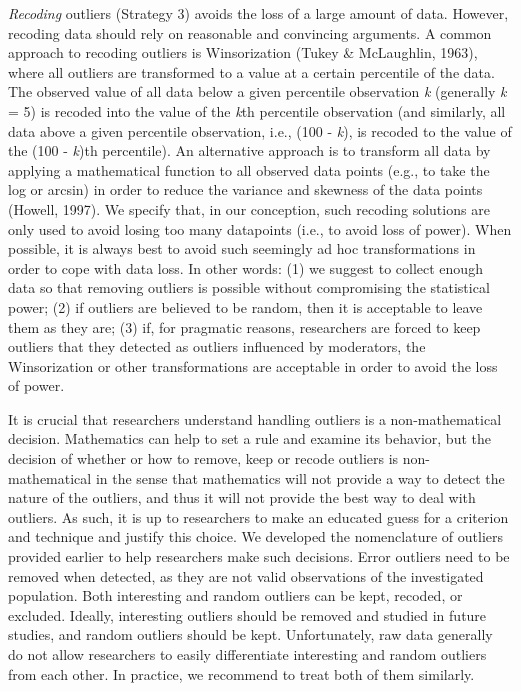 \documentclass[man,floatsintext]{apa6}
\begin{document}
\emph{Recoding} outliers (Strategy 3) avoids the loss of a large amount of data. However, recoding data should rely on reasonable and convincing arguments. A common approach to recoding outliers is Winsorization (Tukey \& McLaughlin, 1963), where all outliers are transformed to a value at a certain percentile of the data. The observed value of all data below a given percentile observation \emph{k} (generally \emph{k} = 5) is recoded into the value of the \emph{k}th percentile observation (and similarly, all data above a given percentile observation, i.e., (100 - \emph{k}), is recoded to the value of the (100 - \emph{k})th percentile). An alternative approach is to transform all data by applying a mathematical function to all observed data points (e.g., to take the log or arcsin) in order to reduce the variance and skewness of the data points (Howell, 1997). We specify that, in our conception, such recoding solutions are only used to avoid losing too many datapoints (i.e., to avoid loss of power). When possible, it is always best to avoid such seemingly ad hoc transformations in order to cope with data loss. In other words: (1) we suggest to collect enough data so that removing outliers is possible without compromising the statistical power; (2) if outliers are believed to be random, then it is acceptable to leave them as they are; (3) if, for pragmatic reasons, researchers are forced to keep outliers that they detected as outliers influenced by moderators, the Winsorization or other transformations are acceptable in order to avoid the loss of power.

It is crucial that researchers understand handling outliers is a non-mathematical decision. Mathematics can help to set a rule and examine its behavior, but the decision of whether or how to remove, keep or recode outliers is non-mathematical in the sense that mathematics will not provide a way to detect the nature of the outliers, and thus it will not provide the best way to deal with outliers. As such, it is up to researchers to make an educated guess for a criterion and technique and justify this choice. We developed the nomenclature of outliers provided earlier to help researchers make such decisions. Error outliers need to be removed when detected, as they are not valid observations of the investigated population. Both interesting and random outliers can be kept, recoded, or excluded. Ideally, interesting outliers should be removed and studied in future studies, and random outliers should be kept. Unfortunately, raw data generally do not allow researchers to easily differentiate interesting and random outliers from each other. In practice, we recommend to treat both of them similarly.
\end{document}
